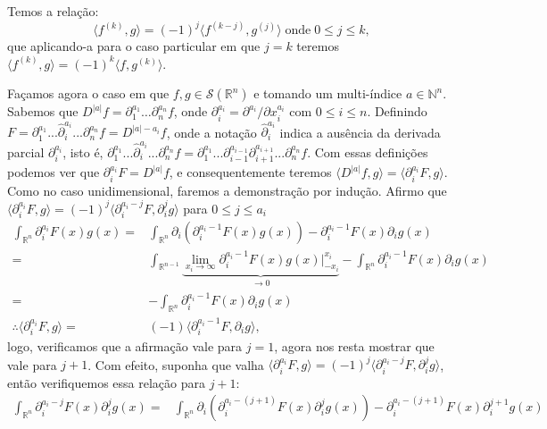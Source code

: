 \documentclass{article}
\begin{document}
\begin{enumerate}
		Temos a relação: 
		$$
		\langle f^{(k)},g \rangle = (-1)^{j}\langle f^{(k-j)},g^{(j)} \rangle \; \text{onde} \; 0 \leq j \leq k,
		$$
		que aplicando-a para o caso particular em que $j = k$ teremos $\langle f^{(k)},g \rangle = (-1)^{k}\langle f,g^{(k)} \rangle$.
		
		Façamos agora o caso em que $f, g \in \mathcal{S}(\mathbb{R}^{n})$ e tomando um multi-índice $a \in \mathbb{N}^{n}$. Sabemos que $D^{|a|}f = \partial^{a_{1}}_{1} \dots \partial^{a_{n}}_{n} f$, onde $\partial^{a_{i}}_{i}  = \partial^{a_{i}}/\partial x^{a_{i}}_{i}$ com $0\leq i \leq n$. Definindo $F = \partial^{a_{1}}_{1}... \hat{\partial}^{a_{i}}_{i}...\partial^{a_{n}}_{n}f = D^{|a|-a_{i}}f$, onde a notação $\hat{\partial}^{a_{i}}_{i}$ indica a ausência da derivada parcial $\partial^{a_{i}}_{i}$, isto é, $\partial^{a_{1}}_{1}... \hat{\partial}^{a_{i}}_{i}...\partial^{a_{n}}_{n}f = \partial^{a_{1}}_{1}... \partial^{a_{i-1}}_{i-1}\partial^{a_{i+1}}_{i+1}...\partial^{a_{n}}_{n}f$. Com essas definições podemos ver que $\partial^{a_{i}}_{i}F = D^{|a|}f$, e consequentemente teremos $\langle D^{|a|}f, g \rangle =\langle \partial^{a_{i}}_{i}F, g \rangle$. Como no caso unidimensional, faremos a demonstração por indução. Afirmo que $\langle \partial^{a_{i}}_{i}F, g \rangle = (-1)^{j} \langle \partial^{a_{i}-j}_{i}F, \partial^{j}_{i}g \rangle$ para $0 \leq j \leq a_{i}$
		$$
		\begin{aligned}
		\int_{\mathbb{R}^{n}}\partial^{a_{i}}_{i}F(x)g(x) = & \int_{\mathbb{R}^{n}} \partial_{i}(\partial^{a_{i}-1}_{i}F(x)g(x)) -  \partial^{a_{i}-1}_{i}F(x) \partial_{i}g(x)
		\\
		= & \int_{\mathbb{R}^{n-1}} \underbrace{ \lim_{x_{i} \to \infty}\partial^{a_{i}-1}_{i}F(x)g(x) \Big|^{x_{i}}_{-x_{i}} }_{\to 0} -  \int_{\mathbb{R}^{n}} \partial^{a_{i}-1}_{i}F(x) \partial_{i}g(x)
		\\
		= & - \int_{\mathbb{R}^{n}}\partial^{a_{i}-1}_{i}F(x) \partial_{i}g(x)
		\\
		\therefore \langle \partial^{a_{i}}_{i}F, g \rangle = & (-1)\langle \partial^{a_{i}-1}_{i}F, \partial_{i}g \rangle,
		\end{aligned}
		$$
		logo, verificamos que a afirmação vale para $j=1$, agora nos resta mostrar que vale para $j+1$. Com efeito, suponha que valha $\langle \partial^{a_{i}}_{i}F, g \rangle = (-1)^{j} \langle \partial^{a_{i}-j}_{i}F, \partial^{j}_{i}g \rangle$, então verifiquemos essa relação para $j+1$:
		$$
		\begin{aligned}
		\int_{\mathbb{R}^{n}}\partial^{a_{i}-j}_{i}F(x) \partial^{j}_{i}g(x) = & \int_{\mathbb{R}^{n}} \partial_{i}(\partial^{a_{i}-(j+1)}_{i}F(x)\partial^{j}_{i}g(x)) -  \partial^{a_{i}-(j+1)}_{i}F(x) \partial^{j+1}_{i}g(x)

\end{aligned}$$
\end{enumerate}
\end{document}
